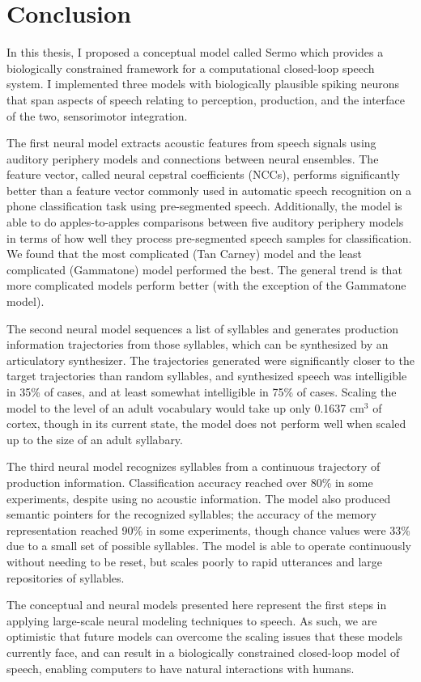 \chapter{Conclusion}
\label{chapt:conclusion}

In this thesis,
I proposed a conceptual model
called Sermo which
provides a biologically constrained framework
for a computational closed-loop speech system.
I implemented three models
with biologically plausible spiking neurons
that span aspects of speech
relating to perception, production,
and the interface of the two,
sensorimotor integration.

The first neural model
extracts acoustic features
from speech signals
using auditory periphery models
and connections between neural ensembles.
The feature vector,
called neural cepstral coefficients (NCCs),
performs significantly better than
a feature vector commonly used
in automatic speech recognition
on a phone classification task
using pre-segmented speech.
Additionally, the model is able
to do apples-to-apples comparisons
between five auditory periphery models
in terms of how well they
process pre-segmented speech samples
for classification.
We found that the
most complicated (Tan Carney) model
and the least complicated (Gammatone) model
performed the best.
The general trend is that
more complicated models
perform better
(with the exception of the Gammatone model).

The second neural model
sequences a list of syllables
and generates production information trajectories
from those syllables,
which can be synthesized by an articulatory synthesizer.
The trajectories generated were
significantly closer
to the target trajectories than
random syllables,
and synthesized speech was intelligible
in 35\% of cases,
and at least somewhat intelligible in 75\% of cases.
Scaling the model to the level of
an adult vocabulary would take up
only 0.1637 cm$^3$ of cortex,
though in its current state,
the model does not perform well
when scaled up
to the size of an adult syllabary.

The third neural model
recognizes syllables from a continuous
trajectory of production information.
Classification accuracy reached
over 80\% in some experiments,
despite using no acoustic information.
The model also produced semantic pointers
for the recognized syllables;
the accuracy of the memory representation
reached 90\% in some experiments,
though chance values were 33\% due to
a small set of possible syllables.
The model is able to operate continuously
without needing to be reset,
but scales poorly to rapid utterances
and large repositories of syllables.

The conceptual and neural models
presented here
represent the first steps
in applying large-scale neural modeling techniques
to speech.
As such, we are optimistic that
future models can overcome
the scaling issues that these models
currently face,
and can result in a biologically constrained
closed-loop model of speech,
enabling computers to
have natural interactions with humans.
